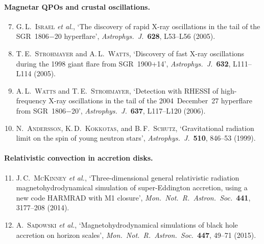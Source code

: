 \paragraph{Magnetar QPOs and crustal oscillations.}
\begin{enumerate}\setcounter{enumi}{6}
  \item G.\,L.~\textsc{Israel} \textit{et al.}, `The discovery of rapid X-ray
    oscillations in the tail of the SGR~1806$-$20 hyperflare',
    \textit{Astrophys.\ J.}\ \textbf{628}, L53--L56 (2005).
  \item T.\,E.~\textsc{Strohmayer} and A.\,L.~\textsc{Watts}, `Discovery of fast
    X-ray oscillations during the 1998 giant flare from SGR~1900+14',
    \textit{Astrophys.\ J.}\ \textbf{632}, L111--L114 (2005).
  \item A.\,L.~\textsc{Watts} and T.\,E.~\textsc{Strohmayer}, `Detection with RHESSI
    of high-frequency X-ray oscillations in the tail of the 2004~December~27
    hyperflare from SGR~1806$-$20',
    \textit{Astrophys.\ J.}\ \textbf{637}, L117--L120 (2006).
  \item N.~\textsc{Andersson}, K.\,D.~\textsc{Kokkotas}, and B.\,F.~\textsc{Schutz},
    `Gravitational radiation limit on the spin of young neutron stars',
    \textit{Astrophys.\ J.}\ \textbf{510}, 846--53 (1999).
\end{enumerate}

\paragraph{Relativistic convection in accretion disks.}
\begin{enumerate}\setcounter{enumi}{10}
  \item J.\,C.~\textsc{McKinney} \textit{et al.}, `Three-dimensional general
    relativistic radiation magnetohydrodynamical simulation of super-Eddington
    accretion, using a new code HARMRAD with M1 closure',
    \textit{Mon.\ Not.\ R.\ Astron.\ Soc.}\ \textbf{441}, 3177--208 (2014).
  \item A.~\textsc{Sa\c{d}owski} \textit{et al.}, `Magnetohydrodynamical
    simulations of black hole accretion on horizon scales',
    \textit{Mon.\ Not.\ R.\ Astron.\ Soc.}\ \textbf{447}, 49--71 (2015).
\end{enumerate}

